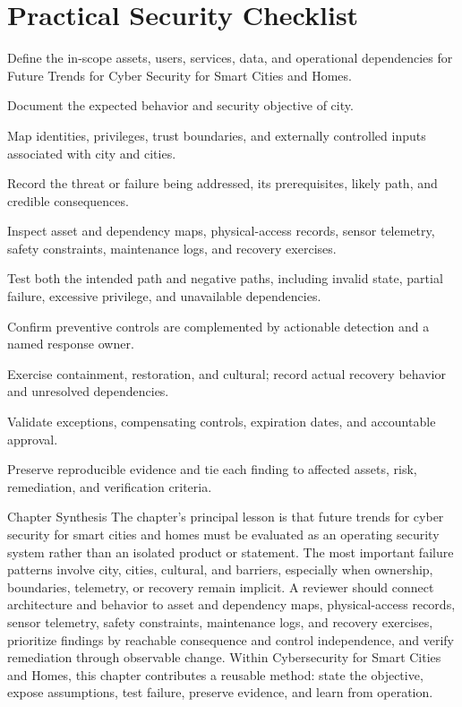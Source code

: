 \documentclass[11pt,letterpaper]{article}
\begin{document}
\section*{Practical Security Checklist}
\begin{CornellChecklist}
\item Define the in-scope assets, users, services, data, and operational dependencies for Future Trends for Cyber Security for Smart Cities and Homes.
\item Document the expected behavior and security objective of city.
\item Map identities, privileges, trust boundaries, and externally controlled inputs associated with city and cities.
\item Record the threat or failure being addressed, its prerequisites, likely path, and credible consequences.
\item Inspect asset and dependency maps, physical-access records, sensor telemetry, safety constraints, maintenance logs, and recovery exercises.
\item Test both the intended path and negative paths, including invalid state, partial failure, excessive privilege, and unavailable dependencies.
\item Confirm preventive controls are complemented by actionable detection and a named response owner.
\item Exercise containment, restoration, and cultural; record actual recovery behavior and unresolved dependencies.
\item Validate exceptions, compensating controls, expiration dates, and accountable approval.
\item Preserve reproducible evidence and tie each finding to affected assets, risk, remediation, and verification criteria.
\end{CornellChecklist}
\begin{CornellSummaryBox}{Chapter Synthesis}
The chapter's principal lesson is that future trends for cyber security for smart cities and homes must be evaluated as an operating security system rather than an isolated product or statement. The most important failure patterns involve city, cities, cultural, and barriers, especially when ownership, boundaries, telemetry, or recovery remain implicit. A reviewer should connect architecture and behavior to asset and dependency maps, physical-access records, sensor telemetry, safety constraints, maintenance logs, and recovery exercises, prioritize findings by reachable consequence and control independence, and verify remediation through observable change. Within Cybersecurity for Smart Cities and Homes, this chapter contributes a reusable method: state the objective, expose assumptions, test failure, preserve evidence, and learn from operation.
\end{CornellSummaryBox}
\end{document}
